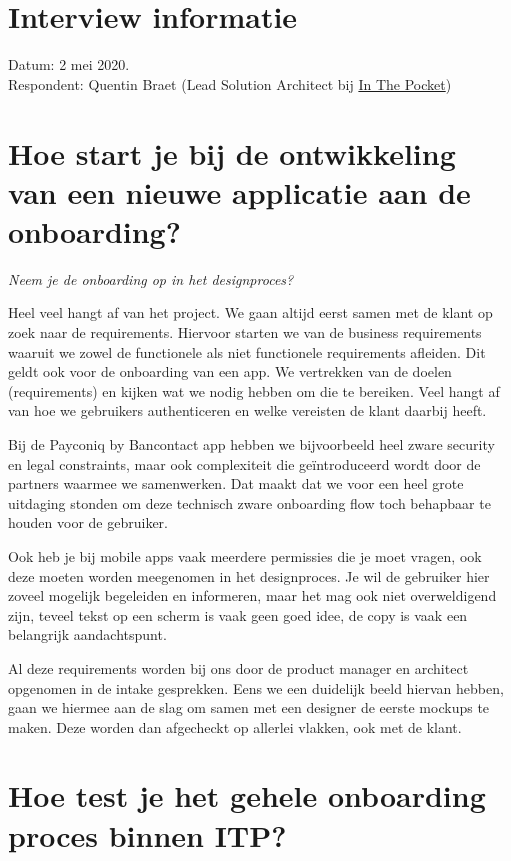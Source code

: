 \section{Interview informatie}

Datum: 2 mei 2020. \\
Respondent: Quentin Braet (Lead Solution Architect bij \href{https://www.inthepocket.com/}{In The Pocket})

\section[Vraag 1]{Hoe start je bij de ontwikkeling van een nieuwe applicatie aan de onboarding?}

\textit{Neem je de onboarding op in het designproces?}

Heel veel hangt af van het project. We gaan altijd eerst samen met de klant op zoek naar de requirements. Hiervoor starten we van de business requirements waaruit we zowel de  functionele als niet functionele requirements afleiden. Dit geldt ook voor de onboarding van een app. We vertrekken van de doelen (requirements) en kijken wat we nodig hebben om die te bereiken. Veel hangt af van hoe we gebruikers authenticeren en welke vereisten de klant daarbij heeft.

Bij de Payconiq by Bancontact app hebben we bijvoorbeeld heel zware security en legal constraints, maar ook complexiteit die geïntroduceerd wordt door de partners waarmee we samenwerken. Dat maakt dat we voor een heel grote uitdaging stonden om deze technisch zware onboarding flow toch behapbaar te houden voor de gebruiker.

Ook heb je bij mobile apps vaak meerdere permissies die je moet vragen, ook deze moeten worden meegenomen in het designproces. Je wil de gebruiker hier zoveel mogelijk begeleiden en informeren, maar het mag ook niet overweldigend zijn, teveel tekst op een scherm is vaak geen goed idee, de copy is vaak een belangrijk aandachtspunt.

Al deze requirements worden bij ons door de product manager en architect opgenomen in de intake gesprekken. Eens we een duidelijk beeld hiervan hebben, gaan we hiermee aan de slag om samen met een designer de eerste mockups te maken. Deze worden dan afgecheckt op allerlei vlakken, ook met de klant.

\section[Vraag 2]{Hoe test je het gehele onboarding proces binnen ITP?}

